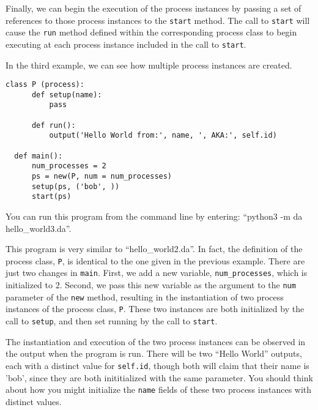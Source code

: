 \documentclass[11pt]{article}
\begin{document}
Finally, we can begin the execution of the process instances by passing a set
of references to those process instances to the \texttt{start} method. The call
to \texttt{start} will cause the \texttt{run} method defined within the
corresponding process class to begin executing at each process instance
included in the call to \texttt{start}.

In the third example, we can see how multiple process instances are created.

\begin{lstlisting}[caption={hello\_world03.da - Multiple Process Instances}, label={lst:hw03}]
  class P (process):
      def setup(name):
          pass

      def run():
          output('Hello World from:', name, ', AKA:', self.id)

  def main():
      num_processes = 2
      ps = new(P, num = num_processes)
      setup(ps, ('bob', ))
      start(ps)

\end{lstlisting}

\noindent You can run this program from the command line by entering:
``python3 -m da hello\_world3.da''.

This program is very similar to ``hello\_world2.da''. In fact, the definition of
the process class, \texttt{P}, is identical to the one given in the previous
example. There are just two changes in \texttt{main}. First, we add a new
variable, \texttt{num\_processes}, which is initialized to $2$. Second, we pass
this new variable as the argument to the \texttt{num} parameter of the
\texttt{new} method, resulting in the instantiation of two process instances of
the process class, \texttt{P}. These two instances are both initialized by the
call to \texttt{setup}, and then set running by the call to \texttt{start}.

The instantiation and execution of the two process instances can be observed in
the output when the program is run. There will be two ``Hello World'' outputs,
each with a distinct value for \texttt{self.id}, though both will claim that
their name is 'bob', since they are both inititialized with the same parameter.
You should think about how you might initialize the \texttt{name} fields of
these two process instances with distinct values.
\end{document}
